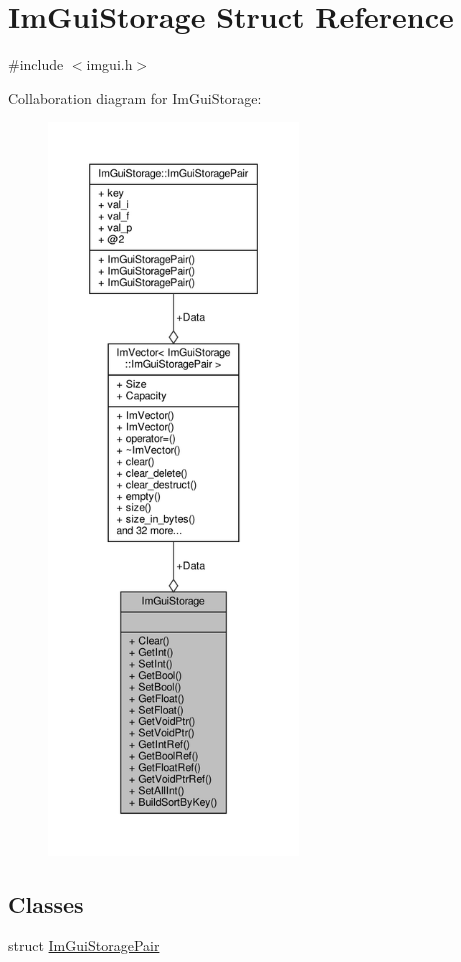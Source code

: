 \hypertarget{structImGuiStorage}{}\section{Im\+Gui\+Storage Struct Reference}
\label{structImGuiStorage}


{\ttfamily \#include $<$imgui.\+h$>$}



Collaboration diagram for Im\+Gui\+Storage\+:
\nopagebreak
\begin{figure}[H]
\begin{center}
\leavevmode
\includegraphics[height=550pt]{structImGuiStorage__coll__graph}
\end{center}
\end{figure}
\subsection*{Classes}
\begin{DoxyCompactItemize}
\item 
struct \hyperlink{structImGuiStorage_1_1ImGuiStoragePair}{Im\+Gui\+Storage\+Pair}
\end{DoxyCompactItemize}
